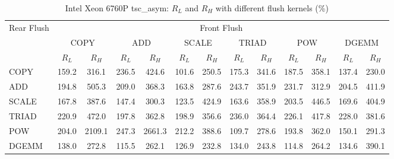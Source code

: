 \begin{table}[htbp]
\centering
\caption{Intel Xeon 6760P tsc\_asym: $R_L$ and $R_H$ with different flush kernels (\%)}
\label{tab:frkern-cgnr6760pn2-tsc_asym}
\begin{tabular*}{\textwidth}{@{\extracolsep{\fill}}lcccccccccccc}
\toprule
\multirow{3}{*}{Rear Flush} & \multicolumn{12}{c}{Front Flush} \\ \cmidrule(lr){2-13}
& \multicolumn{2}{c}{COPY} & \multicolumn{2}{c}{ADD} & \multicolumn{2}{c}{SCALE} & \multicolumn{2}{c}{TRIAD} & \multicolumn{2}{c}{POW} & \multicolumn{2}{c}{DGEMM} \\ \cmidrule(lr){2-3} \cmidrule(lr){4-5} \cmidrule(lr){6-7} \cmidrule(lr){8-9} \cmidrule(lr){10-11} \cmidrule(lr){12-13}
& $R_L$ & $R_H$ & $R_L$ & $R_H$ & $R_L$ & $R_H$ & $R_L$ & $R_H$ & $R_L$ & $R_H$ & $R_L$ & $R_H$ \\ \midrule
COPY & 159.2 & 316.1 & 236.5 & 424.6 & 101.6 & 250.5 & 175.3 & 341.6 & 187.5 & 358.1 & 137.4 & 230.0 \\
ADD & 194.8 & 505.3 & 209.0 & 368.3 & 163.8 & 287.6 & 243.7 & 351.9 & 231.7 & 312.9 & 204.5 & 411.9 \\
SCALE & 167.8 & 387.6 & 147.4 & 300.3 & 123.5 & 424.9 & 163.6 & 358.9 & 203.5 & 446.5 & 169.6 & 404.9 \\
TRIAD & 220.9 & 472.0 & 197.8 & 362.8 & 198.9 & 356.6 & 236.0 & 364.4 & 226.1 & 417.8 & 228.0 & 381.6 \\
POW & 204.0 & 2109.1 & 247.3 & 2661.3 & 212.2 & 388.6 & 109.7 & 278.6 & 193.8 & 362.0 & 150.1 & 291.3 \\
DGEMM & 138.0 & 272.8 & 115.5 & 262.1 & 126.9 & 232.8 & 134.0 & 243.8 & 114.8 & 264.2 & 134.6 & 390.1 \\
\bottomrule
\end{tabular*}
\end{table}